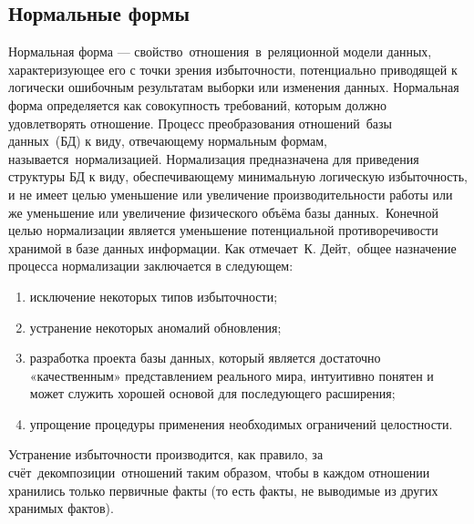 \subsection{Нормальные формы}
Нормальная форма — свойство отношения в реляционной модели данных, характеризующее его с точки зрения избыточности, потенциально приводящей к логически ошибочным результатам выборки или изменения данных. Нормальная форма определяется как совокупность требований, которым должно удовлетворять отношение.
Процесс преобразования отношений базы данных (БД) к виду, отвечающему нормальным формам, называется нормализацией. Нормализация предназначена для приведения структуры БД к виду, обеспечивающему минимальную логическую избыточность, и не имеет целью уменьшение или увеличение производительности работы или же уменьшение или увеличение физического объёма базы данных. Конечной целью нормализации является уменьшение потенциальной противоречивости хранимой в базе данных информации. Как отмечает К. Дейт, общее назначение процесса нормализации заключается в следующем:
\begin{enumerate}

	\item исключение некоторых типов избыточности;
	\item устранение некоторых аномалий обновления;
	\item разработка проекта базы данных, который является достаточно «качественным» представлением реального мира, интуитивно понятен и может служить хорошей основой для последующего расширения;
	\item упрощение процедуры применения необходимых ограничений целостности.

\end{enumerate}
Устранение избыточности производится, как правило, за счёт декомпозиции отношений таким образом, чтобы в каждом отношении хранились только первичные факты (то есть факты, не выводимые из других хранимых фактов)\cite{book6}.


